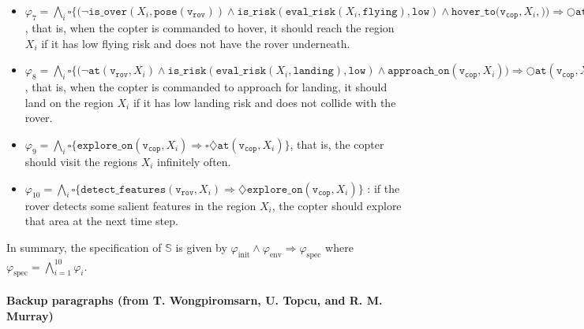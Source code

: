 \documentclass[10pt,letterpaper]{article}
\newcommand{\fDetectFeatures}[2]{\ensuremath{ \mathtt{detect\_features} ( #1, #2 ) }}
\newcommand{\fEvaluateRisk}[2]{\ensuremath{ \mathtt{eval\_risk} ( #1, #2 ) }}
\newcommand{\fIsRisk}[2]{\ensuremath{ \mathtt{is\_risk} ( #1, #2 ) }}
\newcommand{\fAtPose}[2]{\ensuremath{ \mathtt{at} ( #1, #2 ) }}
\newcommand{\fPose}[1]{\ensuremath{ \mathtt{pose} (#1)}}
\newcommand{\fIsOver}[2]{\ensuremath{ \mathtt{is\_over} (#1, #2) }}
\newcommand{\fCommandExploreOn}[2]{\ensuremath{ \mathtt{explore\_on} (#1, #2) }}
\newcommand{\fCommandApproachOn}[2]{\ensuremath{ \mathtt{approach\_on} (#1, #2) }}
\newcommand{\fCommandHoverTo}[2]{\ensuremath{ \mathtt{hover\_to} (#1,#2) }}
\newcommand{\vRover}{\ensuremath{\mathtt{v_{rov}}}}
\newcommand{\vCopter}{\ensuremath{\mathtt{v_{cop}}}}
\newcommand{\cnstFlying}{\ensuremath{\mathtt{flying}}}
\newcommand{\cnstLanding}{\ensuremath{\mathtt{landing}}}
\newcommand{\cnstLow}{\ensuremath{\mathtt{low}}}
\begin{document}
\begin{itemize}
	\item $\varphi_{7} = \bigwedge_{i} \square \bigl\{ \bigl( \neg \fIsOver{X_{i}}{\fPose{\vRover}} \land \fIsRisk{ \fEvaluateRisk{X_{i}}{\cnstFlying} } {\cnstLow} \land \fCommandHoverTo{\vCopter, X_{i}} \bigr) \Rightarrow  \bigcirc \fAtPose{\vCopter}{X_{i}}  \bigr\} $, that is, when the copter is commanded to hover, it should reach the region $X_{i}$ if it has low flying risk and does not have the rover underneath.  

	\item $\varphi_{8} = \bigwedge_{i} \square \bigl\{ \bigl( \neg\fAtPose{\vRover}{X_{i}} \land \fIsRisk{ \fEvaluateRisk{X_{i}}{\cnstLanding} } {\cnstLow} \land \fCommandApproachOn{\vCopter}{X_{i}} \bigr) \Rightarrow  \bigcirc \fAtPose{\vCopter}{X_{i}}  \bigr\} $, that is, when the copter is commanded to approach for landing, it should land on the region $X_{i}$ if it has low landing risk and does not collide with the rover.

		
	\item $\varphi_{9} = \bigwedge_{i} \square \bigl\{  \fCommandExploreOn{\vCopter}{X_{i}} \Rightarrow  \square \diamondsuit  \fAtPose{\vCopter}{ X_{i} }  \bigr\}  $, that is, the copter should visit the regions $X_{i}$ infinitely often.
	
	\item $\varphi_{10} = \bigwedge_{i} \square \bigl\{  \fDetectFeatures{\vRover}{X_{i}}  \Rightarrow \diamondsuit \fCommandExploreOn{\vCopter}{X_{i}} \bigr\} $ : if the rover detects some salient features in the region $X_{i}$, the  copter should explore that area at the next time step.		
\end{itemize}




In summary, the specification of $\mathbb{S}$ is given by $\varphi_{\mathrm{init}} \land \varphi_{\mathrm{env}} \Rightarrow \varphi_{\mathrm{spec}}$ where $\varphi_{\mathrm{spec}} = \bigwedge_{i = 1}^{10} \varphi_{i}$.


\paragraph{Backup paragraphs (from T. Wongpiromsarn, U. Topcu, and R. M. Murray)}
\end{document}
